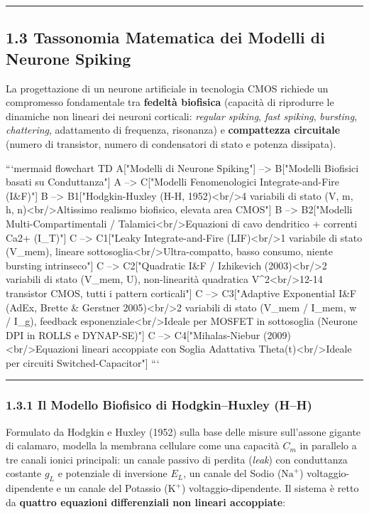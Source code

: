 \documentclass[11pt,a4paper]{article}
\begin{document}
\bigskip\hrule\bigskip

\subsection{1.3 Tassonomia Matematica dei Modelli di Neurone Spiking}

La progettazione di un neurone artificiale in tecnologia CMOS richiede un compromesso fondamentale tra \textbf{fedeltà biofisica} (capacità di riprodurre le dinamiche non lineari dei neuroni corticali: \textit{regular spiking}, \textit{fast spiking}, \textit{bursting}, \textit{chattering}, adattamento di frequenza, risonanza) e \textbf{compattezza circuitale} (numero di transistor, numero di condensatori di stato e potenza dissipata).

```mermaid
flowchart TD
A["Modelli di Neurone Spiking"] --> B["Modelli Biofisici basati su Conduttanza"]
A --> C["Modelli Fenomenologici Integrate-and-Fire (I\&F)"]
B --> B1["Hodgkin-Huxley (H-H, 1952)<br/>4 variabili di stato (V, m, h, n)<br/>Altissimo realismo biofisico, elevata area CMOS"]
B --> B2["Modelli Multi-Compartimentali / Talamici<br/>Equazioni di cavo dendritico + correnti Ca2+ (I\_T)"]
C --> C1["Leaky Integrate-and-Fire (LIF)<br/>1 variabile di stato (V\_mem), lineare sottosoglia<br/>Ultra-compatto, basso consumo, niente bursting intrinseco"]
C --> C2["Quadratic I\&F / Izhikevich (2003)<br/>2 variabili di stato (V\_mem, U), non-linearità quadratica V\textasciicircum{}2<br/>12-14 transistor CMOS, tutti i pattern corticali"]
C --> C3["Adaptive Exponential I\&F (AdEx, Brette \& Gerstner 2005)<br/>2 variabili di stato (V\_mem / I\_mem, w / I\_g), feedback esponenziale<br/>Ideale per MOSFET in sottosoglia (Neurone DPI in ROLLS e DYNAP-SE)"]
C --> C4["Mihalas-Niebur (2009)<br/>Equazioni lineari accoppiate con Soglia Adattativa Theta(t)<br/>Ideale per circuiti Switched-Capacitor"]
```

\bigskip\hrule\bigskip

\subsubsection{1.3.1 Il Modello Biofisico di Hodgkin--Huxley (H--H)}

Formulato da Hodgkin e Huxley (1952) sulla base delle misure sull'assone gigante di calamaro, modella la membrana cellulare come una capacità $C_m$ in parallelo a tre canali ionici principali: un canale passivo di perdita (\textit{leak}) con conduttanza costante $g_L$ e potenziale di inversione $E_L$, un canale del Sodio ($\text{Na}^+$) voltaggio-dipendente e un canale del Potassio ($\text{K}^+$) voltaggio-dipendente. Il sistema è retto da \textbf{quattro equazioni differenziali non lineari accoppiate}:
\end{document}

